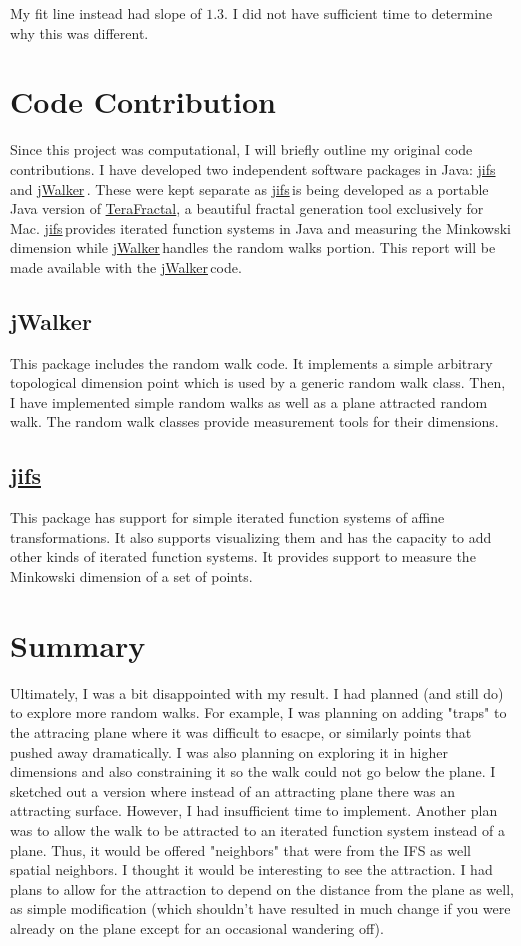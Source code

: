 \documentclass{article}
\newcommand{\jifs}{\href{https://github.com/jmbhughes/jifs}{jifs}\,}
\newcommand{\jwalker}{\href{https://github.com/jmbhughes/jWalker}{jWalker}\,}
\begin{document}
My fit line instead had slope of $1.3$. I did not have sufficient time to determine why this was different. 

\section{Code Contribution}
Since this project was computational, I will briefly outline my original code contributions. I have developed two independent software packages in Java: \jifs and \jwalker. These were kept separate as \jifs is being developed as a portable Java version of \href{https://www.matheasel.com/terafractal/mac/}{TeraFractal}, a beautiful fractal generation tool exclusively for Mac. \jifs provides iterated function systems in Java and measuring the Minkowski dimension while \jwalker handles the random walks portion. This report will be made available with the \jwalker code.

\subsection{jWalker}
This package includes the random walk code. It implements a simple arbitrary topological dimension point which is used by a generic random walk class. Then, I have implemented simple random walks as well as a plane attracted random walk. The random walk classes provide measurement tools for their dimensions. 

\subsection{\jifs}
This package has support for simple iterated function systems of affine transformations. It also supports visualizing them and has the capacity to add other kinds of iterated function systems. It provides support to measure the Minkowski dimension of a set of points. 

\section{Summary}
Ultimately, I was a bit disappointed with my result. I had planned (and still do) to explore more random walks. For example, I was planning on adding "traps" to the attracing plane where it was difficult to esacpe, or similarly points that pushed away dramatically. I was also planning on exploring it in higher dimensions and also constraining it so the walk could not go below the plane. I sketched out a version where instead of an attracting plane there was an attracting surface. However, I had insufficient time to implement. Another plan was to allow the walk to be attracted to an iterated function system instead of a plane. Thus, it would be offered "neighbors" that were from the IFS as well spatial neighbors. I thought it would be interesting to see the attraction. I had plans to allow for the attraction to depend on the distance from the plane as well, as simple modification (which shouldn't have resulted in much change if you were already on the plane except for an occasional wandering off). 
\end{document}
